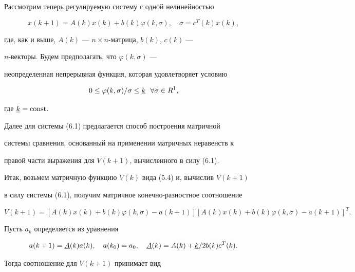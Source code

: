 Рассмотрим теперь регулируемую систему с одной нелинейностью


\begin{equation}


x(k+1)=A(k)x(k)+b(k)\varphi(k,\sigma),\quad \sigma=c^T(k)x(k),


\end{equation}


где, как и выше, $A(k)$ --- $n\times n$-матрица, $b(k)$, $c(k)$ ---


$n$-векторы. Будем предполагать, что $\varphi(k,\sigma)$ ---


неопределенная непрерывная функция, которая удовлетворяет условию


\begin{equation}


0\le\varphi(k,\sigma)/\sigma\le\uk\ \ \forall\sigma\in R^1,


\end{equation}


где $\underline k=\operatorname{const}$.





Далее для системы (6.1) предлагается способ построения матричной


системы сравнения, основанный на применении матричных неравенств к


правой части выражения для $V(k+1)$, вычисленного в силу (6.1).





Итак, возьмем матричную функцию $V(k)$ вида (5.4) и, вычислив $V(k+1)$


в силу системы (6.1), получим матричное конечно-разностное соотношение


$$


V(k+1)=[A(k)x(k)+b(k)\varphi(k,\sigma)-a(k+1)][A(k)x(k)+b(k)


\varphi(k,\sigma)-a(k+1)]^T.


$$





Пусть $a_k$ определяется из уравнения


\begin{equation}


a(k+1)=\uA(k)a(k),\quad a(k_0)=a_0,\quad \uA(k)=A(k)+\uk/2b(k)c^T(k).


\end{equation}


Тогда соотношение для $V(k+1)$ принимает вид



